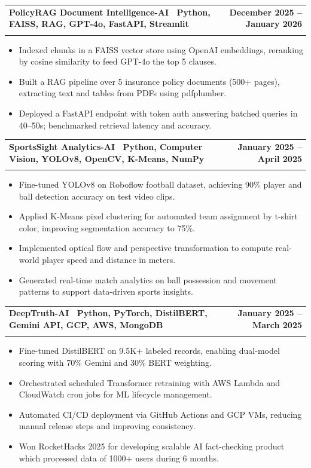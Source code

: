 \documentclass[letterpaper,11pt]{article}
\makeatletter
\newcommand{\resumeItem}[1]{\item\small{#1 \vspace{-4pt}}}
\newcommand{\resumeSubheading}[4]{
    \vspace{-2pt}\item
    \begin{tabular*}{1.0\textwidth}[t]{l@{\extracolsep{\fill}}r}
        \textbf{#1} & \textbf{\small #2} \\
        \textit{\small#3} & \textit{\small #4}
    \end{tabular*}\vspace{-7pt}
}
\newcommand{\resumeItemListStart}{\begin{itemize}}
\newcommand{\resumeItemListEnd}{\end{itemize}\vspace{-7pt}}
\makeatother
\begin{document}
\resumeSubheading
{\textbf{PolicyRAG Document Intelligence-AI} \textnormal{\textbar\ {Python, FAISS, RAG, GPT-4o, FastAPI, Streamlit}}}{December 2025 -- January 2026}{}{}
\vspace{-0.6cm}
\resumeItemListStart

\resumeItem{Indexed chunks in a FAISS vector store using OpenAI embeddings, reranking by cosine similarity to feed GPT-4o the top 5 clauses.}
\vspace{0.15cm}
\resumeItem{Built a RAG pipeline over 5 insurance policy documents (500+ pages), extracting text and tables from PDFs using pdfplumber.}
\vspace{0.15cm}
\resumeItem{Deployed a FastAPI endpoint with token auth answering batched queries in 40--50s; benchmarked retrieval latency and accuracy.}
\vspace{0.15cm}
\resumeItemListEnd

\resumeSubheading
{\textbf{SportsSight Analytics-AI} \textnormal{\textbar\ {Python, Computer Vision, YOLOv8, OpenCV, K-Means, NumPy}}}{January 2025 -- April 2025}{}{}
\vspace{-0.6cm}
\resumeItemListStart
\resumeItem{Fine-tuned YOLOv8 on Roboflow football dataset, achieving 90\% player and ball detection accuracy on test video clips.}
\vspace{0.15cm}
\resumeItem{Applied K-Means pixel clustering for automated team assignment by t-shirt color, improving segmentation accuracy to 75\%.}
\vspace{0.15cm}
\resumeItem{Implemented optical flow and perspective transformation to compute real-world player speed and distance in meters.}
\vspace{0.15cm}
\resumeItem{Generated real-time match analytics on ball possession and movement patterns to support data-driven sports insights.}
\vspace{0.15cm}
\resumeItemListEnd

\resumeSubheading
{\textbf{DeepTruth-AI} \textnormal{\textbar\ {Python, PyTorch, DistilBERT, Gemini API, GCP, AWS, MongoDB}}}{January 2025 -- March 2025}{}{}
\vspace{-0.6cm}
\resumeItemListStart

\resumeItem{Fine-tuned DistilBERT on 9.5K+ labeled records, enabling dual-model scoring with 70\% Gemini and 30\% BERT weighting.}
\vspace{0.15cm}
\resumeItem{Orchestrated scheduled Transformer retraining with AWS Lambda and CloudWatch cron jobs for ML lifecycle management.}
\vspace{0.15cm}
\resumeItem{Automated CI/CD deployment via GitHub Actions and GCP VMs, reducing manual release steps and improving consistency.}
\vspace{0.15cm}
\resumeItem{Won RocketHacks 2025 for developing scalable AI fact-checking product which processed data of 1000+ users during  6 months.}
\vspace{0.15cm}
\resumeItemListEnd
\end{document}
